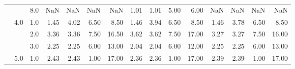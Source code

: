 \begin{tabular}{lllrrrrrrrrrrrr}
        &     & 8.0  &        NaN &       NaN &  NaN &    NaN &       1.01 &      1.01 & 5.00 &   6.00 &        NaN &       NaN &  NaN &    NaN \\
        & 4.0 & 1.0  &       1.45 &      4.02 & 6.50 &   8.50 &       1.46 &      3.94 & 6.50 &   8.50 &       1.46 &      3.78 & 6.50 &   8.50 \\
        &     & 2.0  &       3.36 &      3.36 & 7.50 &  16.50 &       3.62 &      3.62 & 7.50 &  17.00 &       3.27 &      3.27 & 7.50 &  16.00 \\
        &     & 3.0  &       2.25 &      2.25 & 6.00 &  13.00 &       2.04 &      2.04 & 6.00 &  12.00 &       2.25 &      2.25 & 6.00 &  13.00 \\
        & 5.0 & 1.0  &       2.43 &      2.43 & 1.00 &  17.00 &       2.36 &      2.36 & 1.00 &  17.00 &       2.39 &      2.39 & 1.00 &  17.00 \\
\bottomrule
\end{tabular}
